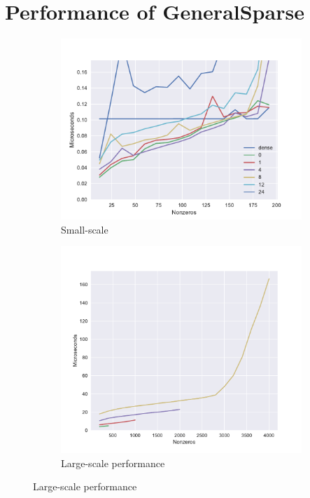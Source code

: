 \section{Performance of GeneralSparse}
\label{section:exp_jump_scaling}


  \begin{figure}[!htb]
    \centering
    \begin{subfigure}[b]{0.8\textwidth}
      \centering
      \includegraphics[width=\textwidth]{images/jump_penalty.pdf}
      \caption{Small-scale }
      \label{fig:unrolled_time}
    \end{subfigure}
    \begin{subfigure}[b]{0.8\textwidth}
      \centering
      \includegraphics[width=\textwidth]{images/jump_scaling.pdf}
      \caption{Large-scale performance}
      \label{fig:unrolled_perf}
    \end{subfigure}
  \end{figure}



